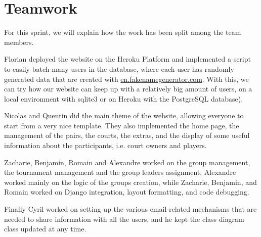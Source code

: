 \section{Teamwork}

For this sprint, we will explain how the work has been split among the team members. \newline

Florian deployed the website on the Heroku Platform and implemented a script to easily batch many users in the database, where each user has randomly generated data that are created
with \url{en.fakenamegenerator.com}. With this, we can try how our website can keep up with a relatively big amount of users, on a local environment with sqlite3 
or on Heroku with the PostgreSQL database). \newline

Nicolas and Quentin did the main theme of the website, allowing everyone to
start from a very nice template. They also implemented the home page, the management of the pairs, the
courts, the extras, and the display of some useful information about the
participants, i.e. court owners and players. \newline

Zacharie, Benjamin, Romain and Alexandre worked on the group management,
the tournament management and the group leaders assignment. Alexandre worked mainly on the logic of the groups creation, while Zacharie, Benjamin, and Romain worked on Django integration, layout formatting, and code debugging. \newline

Finally Cyril worked on setting up the various email-related mechanisms that are needed to share information with all the users, and he kept the class diagram class updated at any time.